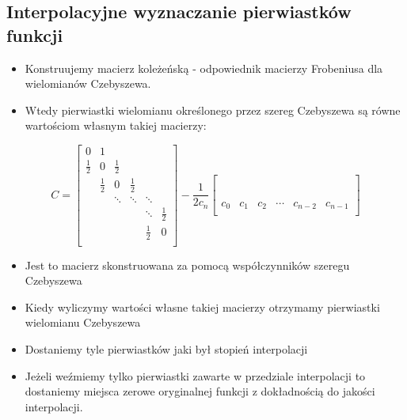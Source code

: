 \documentclass[a4paper]{article}
\begin{document}
\subsection{Interpolacyjne wyznaczanie pierwiastków funkcji}
\begin{itemize}
    \item Konstruujemy macierz koleżeńską - odpowiednik macierzy Frobeniusa dla wielomianów Czebyszewa.
    \item Wtedy pierwiastki wielomianu określonego przez szereg Czebyszewa są równe wartościom własnym takiej macierzy:
\end{itemize}
\begin{equation*}
    C = 
    \begin{bmatrix}
        0 & 1 & & & & \\
        \frac{1}{2} & 0 & \frac{1}{2} & & & \\
        & \frac{1}{2} & 0 & \frac{1}{2} & & \\
        & & \ddots & \ddots & \ddots & \\
        & & & & \ddots & \frac{1}{2} \\
        & & & & \frac{1}{2} & 0 \\
    \end{bmatrix}
    - \frac{1}{2c_n}
    \begin{bmatrix}
        & & & & & \\
        & & & & & \\
        & & & & & \\
        & & & & & \\
        & & & & & \\
        c_0 & c_1 & c_2 & \cdots & c_{n-2} & c_{n-1} \\
    \end{bmatrix}
\end{equation*}
\begin{itemize}
    \item Jest to macierz skonstruowana za pomocą współczynników szeregu Czebyszewa
    \item Kiedy wyliczymy wartości własne takiej macierzy otrzymamy pierwiastki wielomianu Czebyszewa
    \item Dostaniemy tyle pierwiastków jaki był stopień interpolacji
    \item Jeżeli weźmiemy tylko pierwiastki zawarte w przedziale interpolacji to dostaniemy miejsca zerowe oryginalnej funkcji z dokładnością do jakości interpolacji.
\end{itemize}
\end{document}
